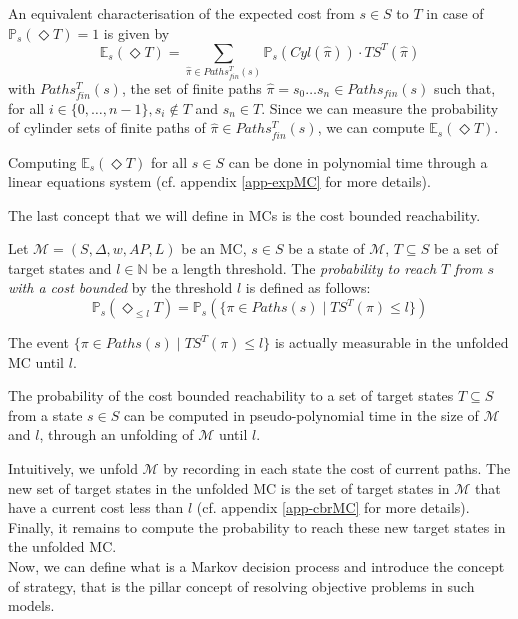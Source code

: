 An equivalent characterisation of the expected cost from $s \in S$ to $T$ in case of $\mathbb{P}_s(\Diamond T) = 1$ is given by
\[
  \mathbb{E}_s(\Diamond T) = \sum_{\hat{\pi} \in Paths_{fin}^T(s)} \mathbb{P}_s(Cyl(\hat{\pi})) \cdot TS^T(\hat{\pi})
\]
with $Paths^T_{fin}(s)$, the set of finite paths $\hat{\pi} = s_0 \dots s_n \in Paths_{fin}(s)$  such that, for all $i \in \{0, \dots, n-1\}, s_i \not \in T$ and $s_n \in T$. Since we can measure the probability of cylinder sets of finite paths of $\hat{\pi} \in Paths_{fin}^T(s)$, we can compute $\mathbb{E}_s(\Diamond T)$.

\begin{theorem}
  Computing $\mathbb{E}_s(\Diamond T)$ for all $s \in S$ can be done in polynomial time through a linear equations system (cf. appendix \ref{app-expMC} for more details).
\end{theorem}

The last concept that we will define in MCs is the cost bounded reachability.

\begin{definition}
	Let $\mathcal{M} = (S, \Delta, w, AP, L)$ be an MC, $s \in S$ be a state of $\mathcal{M}$, $T \subseteq S$ be a set of target states and $l \in \mathbb{N}$ be a length threshold.
  The \textit{probability to reach $T$ from $s$ with a cost bounded} by the threshold $l$ is defined as follows:
	\[
    \mathbb{P}_s(\Diamond_{\leq l} T) = \mathbb{P}_s(\{\pi \in Paths(s) \; | \; TS^T(\pi) \leq l \})
  \]
\end{definition}
The event $\{\pi \in Paths(s) \; | \; TS^T(\pi) \leq l \}$ is actually measurable
in the unfolded MC until $l$.
\begin{theorem}
  The probability of the cost bounded reachability to a set of target states $T \subseteq S$ from a state $s \in S$ can be computed in pseudo-polynomial time in the size of $\mathcal{M}$ and $l$, through an unfolding of $\mathcal{M}$ until $l$.
\end{theorem}

Intuitively, we unfold $\mathcal{M}$ by recording in each state the cost of
current paths. The new set of target states in the unfolded MC is the set of
target states in $\mathcal{M}$ that have a current cost less than $l$ (cf.
appendix \ref{app-cbrMC} for more details). Finally, it remains to compute the probability to
reach these new target states in the unfolded MC. \\

Now, we can define what is a Markov decision process and introduce the concept of strategy, that is the pillar concept of resolving objective problems in such models.

